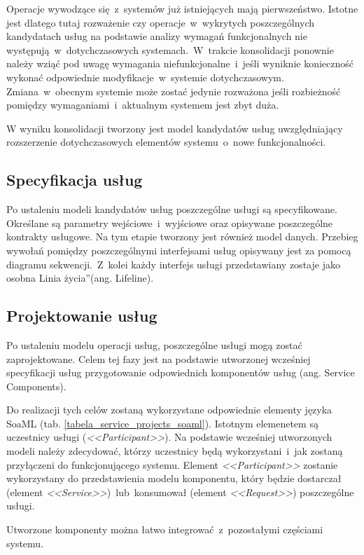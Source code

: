 Operacje wywodzące się~z~systemów już istniejących mają pierwszeństwo. Istotne jest dlatego tutaj rozważenie czy operacje~w~wykrytych poszczególnych kandydatach usług na podstawie analizy wymagań funkcjonalnych nie występują~w~dotychczasowych systemach.~W~trakcie konsolidacji ponownie należy wziąć pod uwagę wymagania niefunkcjonalne~i~jeśli wyniknie konieczność wykonać odpowiednie modyfikacje~w~systemie dotychczasowym. Zmiana~w~obecnym systemie może zostać jedynie rozważona jeśli rozbieżność pomiędzy wymaganiami~i~aktualnym systemem jest zbyt duża. 

W wyniku konsolidacji tworzony jest model kandydatów usług uwzględniający rozszerzenie dotychczasowych elementów systemu~o~nowe funkcjonalności.

\subsection{Specyfikacja usług}
Po ustaleniu modeli kandydatów usług poszczególne usługi są specyfikowane. Określane są parametry wejściowe~i~wyjściowe oraz opisywane poszczególne kontrakty usługowe. Na tym etapie tworzony jest również model danych. Przebieg wywołań pomiędzy poszczególnymi interfejsami usług opisywany jest za pomocą diagramu sekwencji.~Z~kolei każdy interfejs usługi przedstawiany zostaje jako osobna \quotedblbase Linia życia\textquotedblright (ang. Lifeline).

\subsection{Projektowanie usług}
Po ustaleniu modelu operacji usług, poszczególne usługi mogą zostać zaprojektowane. Celem tej fazy jest na podstawie utworzonej wcześniej specyfikacji usług przygotowanie odpowiednich komponentów usług (ang. Service Components). 

Do realizacji tych celów zostaną wykorzystane odpowiednie elementy języka SoaML (tab. \ref{tabela_service_projects_soaml}). Istotnym elemenetem są uczestnicy usługi (\emph{<<Participant>>}).  Na podstawie wcześniej utworzonych modeli należy zdecydować, którzy uczestnicy będą wykorzystani~i~jak zostaną przyłączeni do funkcjonującego systemu. Element \emph{<<Participant>>} zostanie wykorzystany do przedstawienia modelu komponentu, który będzie dostarczał (element \emph{<<Service>>})~lub~konsumował (element \emph{<<Request>>}) poszczególne usługi. 

Utworzone komponenty można łatwo integrować~z~pozostałymi częściami systemu. 


